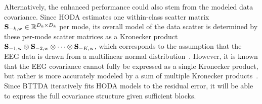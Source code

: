Alternatively, the enhanced performance could also stem from the modeled data
covariance.
Since HODA estimates one within-class scatter matrix
$\mathbf{S}_{-k,\text{w}}\in\mathbb{R}^{D_k\times D_k}$ per mode, its overall
model of the data scatter is determined by these per-mode scatter matrices as a
Kronecker product $\mathbf{S}_{-1,\text{w}}\otimes
\mathbf{S}_{-2,\text{w}}\otimes\cdots\otimes \mathbf{S}_{-K,\text{w}}$, which corresponds to the assumption that the EEG data is
drawn from a multilinear normal distribution~\cite{Ohlson2013}.
However, it is known that the EEG covariance cannot fully be expressed as a
single Kronecker product, but rather is more accurately modeled by a sum of
multiple Kronecker products~\cite{Bijma2005, Sosulski2022}.
Since BTTDA iteratively fits HODA models to the residual error, it will be able
to express the full covariance structure given sufficient blocks.

